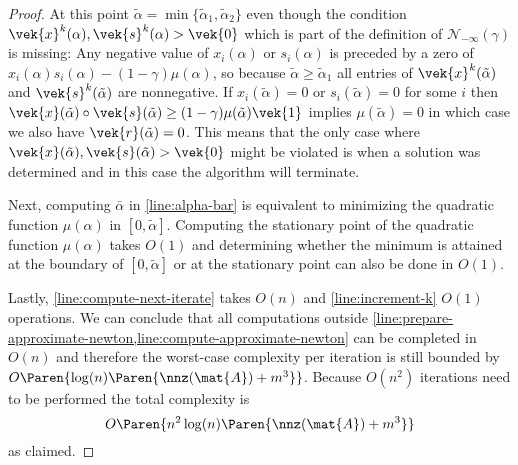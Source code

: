 \begin{proof}
  At this point \(\tilde{\alpha} = \min\{\tilde{\alpha}_1, \tilde{\alpha}_2\}\) even though the condition \(\vek{x}^k(\alpha), \vek{s}^k(\alpha) > \vek{0}\) which is part of the definition of \(\mathcal{N}_{-\infty}(\gamma)\) is missing:
  Any negative value of \(x_i(\alpha)\) or \(s_i(\alpha)\) is preceded by a zero of \(x_i(\alpha) s_i(\alpha) - (1 - \gamma)\mu(\alpha)\), so because \(\tilde{\alpha} \geq \tilde{\alpha}_1\) all entries of \(\vek{x}^k(\tilde{\alpha})\) and \(\vek{s}^k(\tilde{\alpha})\) are nonnegative.
  If \(x_i(\tilde{\alpha}) = 0\) or \(s_i(\tilde{\alpha}) = 0\) for some \(i\) then \(\vek{x}(\tilde{\alpha}) \circ \vek{s}(\tilde{\alpha}) \geq (1 - \gamma)\mu(\tilde{\alpha}) \vek{1}\) implies \(\mu(\tilde{\alpha}) = 0\) in which case we also have \(\vek{r}(\tilde{\alpha}) = 0\).
  This means that the only case where \(\vek{x}(\tilde{\alpha}), \vek{s}(\tilde{\alpha}) > \vek{0}\) might be violated is when a solution was determined and in this case the algorithm will terminate.

  Next, computing \(\bar{\alpha}\) in \cref{line:alpha-bar} is equivalent to minimizing the quadratic function \(\mu(\alpha)\) in \([0, \tilde{\alpha}]\).
  Computing the stationary point of the quadratic function \(\mu(\alpha)\) takes \(O(1)\) and determining whether the minimum is attained at the boundary of \([0, \tilde{\alpha}]\) or at the stationary point can also be done in \(O(1)\).

  Lastly, \cref{line:compute-next-iterate} takes \(O(n)\) and \cref{line:increment-k} \(O(1)\) operations.
  We can conclude that all computations outside \cref{line:prepare-approximate-newton,line:compute-approximate-newton} can be completed in \(O(n)\) and therefore the worst-case complexity per iteration is still bounded by \( O \Paren{\log(n) \Paren{\nnz(\mat{A}) + m^3}} \).
  Because \(O(n^2)\) iterations need to be performed the total complexity is
  \[ O \Paren{n^2 \log(n) \Paren{\nnz(\mat{A}) + m^3}} \]
  as claimed.
\end{proof}
